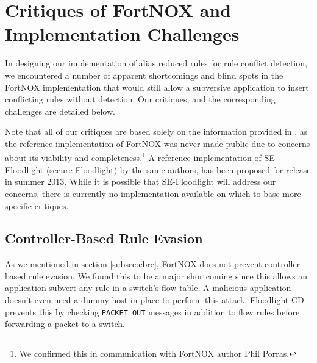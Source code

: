 \section{Critiques of FortNOX and Implementation Challenges}
\label{sec:critique}
In designing our implementation of alias reduced rules for rule conflict detection, we encountered a number of apparent shortcomings and blind spots in the FortNOX implementation that would still allow a subversive application to insert conflicting rules without detection. Our critiques, and the corresponding challenges are detailed below.

Note that all of our critiques are based solely on the information provided in \cite{Porras:2012:SEK:2342441.2342466}, as the reference implementation of FortNOX was never made public due to concerns about its viability and completeness.\footnote{We confirmed this in communication with FortNOX author Phil Porras.} A reference implementation of SE-Floodlight (secure Floodlight) by the same authors, has been proposed for release in summer 2013. While it is possible that SE-Floodlight will address our concerns, there is currently no implementation available on which to base more specific critiques.

\subsection{Controller-Based Rule Evasion}
As we mentioned in section \ref{subsec:cbre}, FortNOX does not prevent controller based rule evasion.
We found this to be a major shortcoming since this allows an application subvert any rule in a switch's flow table.
A malicious application doesn't even need a dummy host in place to perform this attack.
Floodlight-CD prevents this by checking \texttt{PACKET\_OUT} messages in addition to flow rules before forwarding a packet to a switch. 


